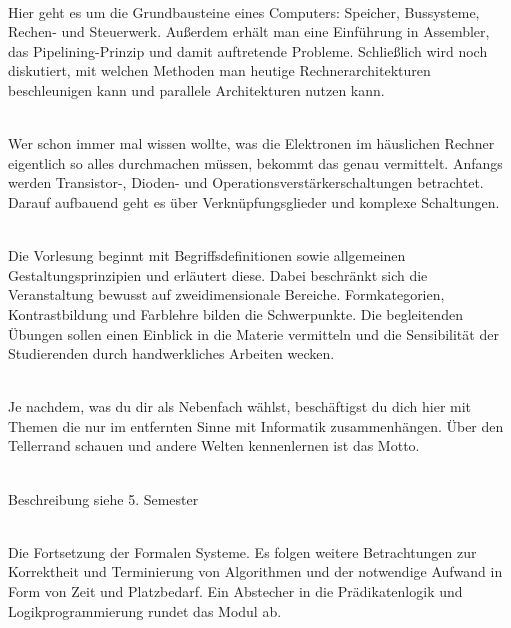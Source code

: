\textbf{} \\
Hier geht es um die Grundbausteine eines Computers:
Speicher, Bussysteme, Rechen- und Steuerwerk.
Außerdem erhält man eine Einführung in Assembler, das Pipelining-Prinzip und damit auftretende Probleme.
Schließlich wird noch diskutiert, mit welchen Methoden man heutige Rechnerarchitekturen beschleunigen kann und parallele Architekturen nutzen kann.

\textbf{} \\
Wer schon immer mal wissen wollte, was die Elektronen im häuslichen Rechner eigentlich so alles durchmachen müssen, bekommt das genau vermittelt.
Anfangs werden Transistor-, Dioden- und Operationsverstärkerschaltungen betrachtet.
Darauf aufbauend geht es über Verknüpfungsglieder und komplexe Schaltungen.

\textbf{} \\
Die Vorlesung beginnt mit Begriffsdefinitionen sowie allgemeinen Gestaltungsprinzipien und erläutert diese.
Dabei beschränkt sich die Veranstaltung bewusst auf zweidimensionale Bereiche.
Formkategorien, Kontrastbildung und Farblehre bilden die Schwerpunkte.
Die begleitenden Übungen sollen einen Einblick in die Materie vermitteln und die Sensibilität der Studierenden durch handwerkliches Arbeiten wecken.

\textbf{} \\
Je nachdem, was du dir als Nebenfach wählst, beschäftigst du dich hier mit Themen die nur im entfernten Sinne mit Informatik zusammenhängen.
Über den Tellerrand schauen und andere Welten kennenlernen ist das Motto.

\textbf{} \\
Beschreibung siehe 5. Semester


\newpage


\textbf{} \\
Die Fortsetzung der Formalen Systeme.
Es folgen weitere Betrachtungen zur Korrektheit und Terminierung von Algorithmen und der notwendige Aufwand in Form von Zeit und Platzbedarf.
Ein Abstecher in die Prädikatenlogik und Logikprogrammierung rundet das Modul ab.

